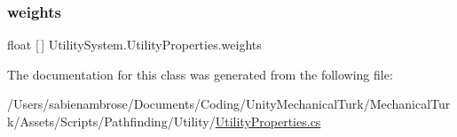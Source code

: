 \subsubsection{\texorpdfstring{weights}{weights}}
{\footnotesize\ttfamily float \mbox{[}$\,$\mbox{]} Utility\+System.\+Utility\+Properties.\+weights}



The documentation for this class was generated from the following file\+:\begin{DoxyCompactItemize}
\item 
/\+Users/sabienambrose/\+Documents/\+Coding/\+Unity\+Mechanical\+Turk/\+Mechanical\+Turk/\+Assets/\+Scripts/\+Pathfinding/\+Utility/\mbox{\hyperlink{_utility_properties_8cs}{Utility\+Properties.\+cs}}\end{DoxyCompactItemize}
